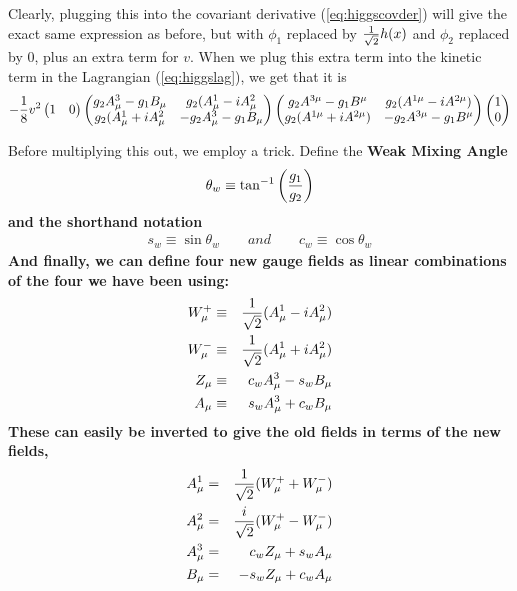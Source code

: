 \documentclass[12pt,epsf]{article}
\def\nolabel{\nonumber }
\def\nolabel{\nonumber }
\begin{document}
Clearly, plugging this into the covariant derivative
(\ref{eq:higgscovder}) will give the exact same expression as before,
but with $\phi_1$ replaced by ${1\over \sqrt{2}}h(x)$ and $\phi_2$
replaced by 0, plus an extra term for $v$.  When we plug this extra
term into the kinetic term in the Lagrangian (\ref{eq:higgslag}), we
get that it is
\begin{eqnarray}
-{1\over 8}v^2
\begin{pmatrix}
1 & 0
\end{pmatrix}
\begin{pmatrix}
g_2A^3_{\mu} - g_1B_{\mu} & g_2(A^1_{\mu} - iA^2_{\mu} \\
g_2(A^1_{\mu} + i A^2_{\mu} & -g_2A^3_{\mu} - g_1B_{\mu}
\end{pmatrix}
\begin{pmatrix}
g_2A^{3\mu} - g_1B^{\mu} & g_2(A^{1\mu} - iA^{2\mu}) \\
g_2(A^{1\mu} + iA^{2\mu}) & -g_2A^{3\mu} - g_1 B^{\mu}
\end{pmatrix}
\begin{pmatrix}
1 \\ 0
\end{pmatrix} \nolabel \\ \label{eq:asdfa}
\end{eqnarray}

Before multiplying this out, we employ a trick.  Define the \bf Weak
Mixing Angle \rm
\begin{eqnarray}
\theta_w \equiv \tan^{-1}\bigg({g_1 \over g_2}\bigg)\nolabel
\end{eqnarray}
and the shorthand notation
\begin{eqnarray}
s_w \equiv \sin \theta_w \qquad and \qquad c_w \equiv
\cos\theta_w\nolabel
\end{eqnarray}
And finally, we can define four new gauge fields as linear combinations
of the four we have been using:
\begin{eqnarray}
W^+_{\mu} &\equiv& {1\over \sqrt{2}}(A^1_{\mu} - i A^2_{\mu})
\label{eq:lowenef1}\\
W^-_{\mu} &\equiv& {1\over \sqrt{2}}(A^1_{\mu} + i A^2_{\mu})
\label{eq:lowenef3}\\
Z_{\mu} &\equiv & c_wA^3_{\mu} - s_wB_{\mu} \\
A_{\mu} &\equiv & s_wA^3_{\mu}+c_wB_{\mu}  \label{eq:lowenef2}
\end{eqnarray}
These can easily be inverted to give the old fields in terms of the new
fields,
\begin{eqnarray}
A^1_{\mu} &=& {1\over \sqrt{2}} (W^+_{\mu} + W^-_{\mu})
\label{eq:thisone}\\
A^2_{\mu} &=& {i \over \sqrt{2}}(W^+_{\mu} - W^-_{\mu}) \\
A^3_{\mu} &=& c_wZ_{\mu} + s_wA_{\mu} \\
B_{\mu} &=& -s_wZ_{\mu} + c_wA_{\mu} \label{eq:thisonetoo}
\end{eqnarray}
\end{document}
